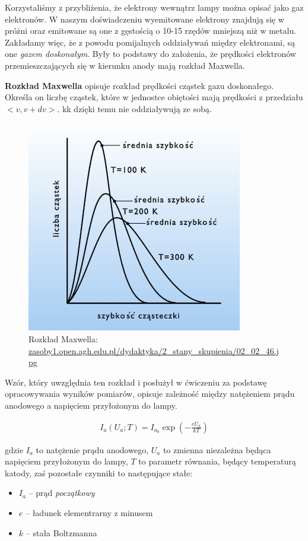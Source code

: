 \documentclass[a4paper]{article}
\newlength{\du}
\begin{document}
Korzystaliśmy z przybliżenia, że elektrony wewnątrz lampy można opisać jako gaz elektronów.
W naszym doświadczeniu wyemitowane elektrony znajdują się w próżni oraz emitowane są one
z gęstością o 10-15 rzędów mniejszą niż w metalu. Zakładamy więc, że z powodu pomijalnych oddziaływań
między elektronami, są one \textit{gazem doskonałym}.
Były to podstawy do założenia, że prędkości elektronów przemieszczających się w kierunku anody 
mają rozkład Maxwella.

\textbf{Rozkład Maxwella} opisuje rozkład prędkości cząstek gazu doskonałego.
Określa on liczbę cząstek, które w jednostce obiętości mają prędkości z przedziału $<v, v + dv>$.
kk
dzięki temu nie oddziaływują ze sobą. 


\begin{figure}[h!]
\centering
\includegraphics[scale=0.5]{rozlad_maxwella.jpg}
\caption{Rozkład Maxwella: \url{zasoby1.open.agh.edu.pl/dydaktyka/2\_stany\_skupienia/02\_02\_46.jpg}}
\end{figure}

Wzór, który uwzględnia ten rozkład i posłużył w ćwiczeniu za podstawę opracowywania wyników pomiarów,
opisuje zależność między natężeniem prądu anodowego a napięciem przyłożonym do lampy.

\begin{align}
	I_a(U_a; T) = I_{a_0} \exp{\left(-\frac{e U_a}{k T}\right)}
\label{eq1}
\end{align}

gdzie $I_a$ to natężenie prądu anodowego, $U_a$ to zmienna niezależna będąca napięciem przyłożonym do lampy,
$T$ to parametr równania, będący temperaturą katody, zaś pozostałe czynniki to następujące stałe:
\begin{itemize}
\item $I_a$ -- prąd \textit{początkowy}
\item $e$ -- ładunek elementrarny z minusem
\item $k$ -- stała Boltzmanna
\end{itemize}
\end{document}
